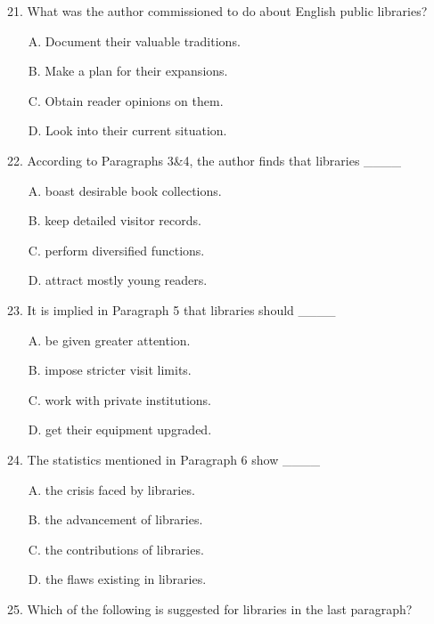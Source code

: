 \documentclass[UTF8,11pt]{ctexart}
\begin{document}
21. What was the author commissioned to do about English public libraries?


\begin{itemize}[leftmargin=2em,itemsep=.2em,topsep=.4em]\item[A.] Document their valuable traditions.
\item[B.] Make a plan for their expansions.
\item[C.] Obtain reader opinions on them.
\item[D.] Look into their current situation.
\end{itemize}

22. According to Paragraphs 3\&4, the author finds that libraries \_\_\_\_


\begin{itemize}[leftmargin=2em,itemsep=.2em,topsep=.4em]\item[A.] boast desirable book collections.
\item[B.] keep detailed visitor records.
\item[C.] perform diversified functions.
\item[D.] attract mostly young readers.
\end{itemize}

23. It is implied in Paragraph 5 that libraries should \_\_\_\_


\begin{itemize}[leftmargin=2em,itemsep=.2em,topsep=.4em]\item[A.] be given greater attention.
\item[B.] impose stricter visit limits.
\item[C.] work with private institutions.
\item[D.] get their equipment upgraded.
\end{itemize}

24. The statistics mentioned in Paragraph 6 show \_\_\_\_


\begin{itemize}[leftmargin=2em,itemsep=.2em,topsep=.4em]\item[A.] the crisis faced by libraries.
\item[B.] the advancement of libraries.
\item[C.] the contributions of libraries.
\item[D.] the flaws existing in libraries.
\end{itemize}

25. Which of the following is suggested for libraries in the last paragraph?
\end{document}

